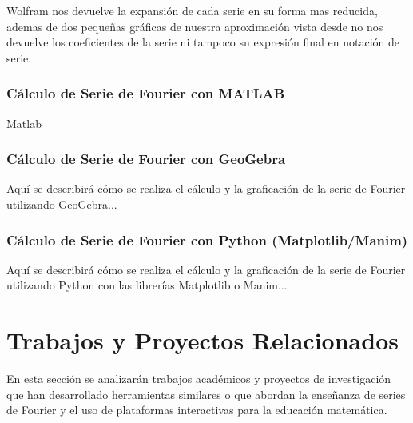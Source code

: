 Wolfram nos devuelve la expansión de cada serie en su forma mas reducida, ademas de dos pequeñas gráficas de nuestra aproximación vista desde  no nos devuelve los coeficientes de la serie ni tampoco su expresión final en notación de serie.

\subsubsection{Cálculo de Serie de Fourier con MATLAB}
Matlab 

\subsubsection{Cálculo de Serie de Fourier con GeoGebra}

Aquí se describirá cómo se realiza el cálculo y la graficación de la serie de Fourier utilizando GeoGebra...

\subsubsection{Cálculo de Serie de Fourier con Python (Matplotlib/Manim)}

Aquí se describirá cómo se realiza el cálculo y la graficación de la serie de Fourier utilizando Python con las librerías Matplotlib o Manim...



\section{Trabajos y Proyectos Relacionados}
En esta sección se analizarán trabajos académicos y proyectos de investigación que han desarrollado herramientas similares o que abordan la enseñanza de series de Fourier y el uso de plataformas interactivas para la educación matemática. 

